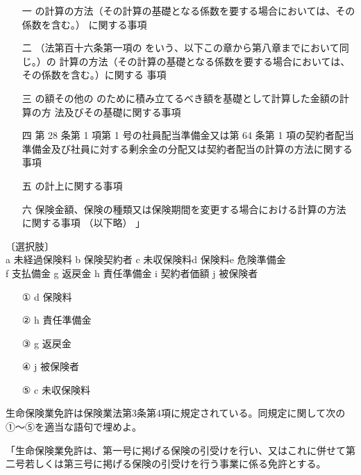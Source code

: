 \documentclass[report,gutter=10mm,fore-edge=10mm,uplatex,dvipdfmx]{jlreq}
\begin{document}
\begin{itemize}
\item[ 一]   の計算の方法（その計算の基礎となる係数を要する場合においては、その係数を含む。） に関する事項
\item[ 二]   （法第百十六条第一項の  をいう、以下この章から第八章までにおいて同じ。）の 計算の方法（その計算の基礎となる係数を要する場合においては、その係数を含む。）に関する 事項
\item[ 三]   の額その他の  のために積み立てるべき額を基礎として計算した金額の計算の方 法及びその基礎に関する事項
\item[ 四]  第 28 条第 1 項第 1 号の社員配当準備金又は第 64 条第 1 項の契約者配当準備金及び社員に対する剰余金の分配又は契約者配当の計算の方法に関する事項
\item[ 五]   の計上に関する事項
\item[ 六]  保険金額、保険の種類又は保険期間を変更する場合における計算の方法に関する事項
 （以下略） 」
\end{itemize}

〔選択肢〕\\
a 未経過保険料 b 保険契約者 c 未収保険料d 保険料e 危険準備金\\
f 支払備金 g 返戻金 h 責任準備金 i 契約者価額 j 被保険者
\answer{}

\begin{itemize}
\item[ ① ] d 保険料
\item[ ② ] h 責任準備金
\item[ ③ ] g 返戻金
\item[ ④ ]  j 被保険者
\item[ ⑤ ] c 未収保険料
\end{itemize}

生命保険業免許は保険業法第3条第4項に規定されている。同規定に関して次の①〜⑤を適当な語句で埋めよ。

「生命保険業免許は、第一号に掲げる保険の引受けを行い、又はこれに併せて第二号若しくは第三号に掲げる保険の引受けを行う事業に係る免許とする。
\end{document}
